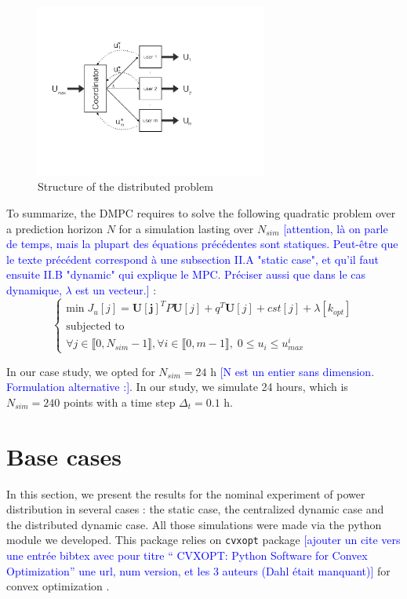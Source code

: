 \documentclass[conference]{IEEEtran}
\newcommand{\rem}[1]{\textcolor{blue}{[#1]}}
\begin{document}
\begin{figure}[!t]
\centering
\includegraphics[width=3in]{ASHschema}
\caption{Structure of the distributed problem}
\label{coord}
\end{figure}
To summarize, the DMPC requires to solve the following quadratic problem over a prediction horizon $N$ for a simulation lasting over $N_{sim}$ \rem{attention, là on parle de temps, mais la plupart des équations précédentes sont statiques. Peut-être que le texte précédent correspond à une subsection II.A "static case", et qu'il faut ensuite II.B "dynamic" qui explique le MPC.
Préciser aussi que dans le cas dynamique, $\lambda$ est un vecteur.} :
\begin{equation}
\left\{
\begin{array}{l}
\text{min} \; J_u[j] =   \bm{U[j]}^T P \bm{U}[j] + q^T \bm{U}[j] + cst[j] + \lambda[k_{opt}]  \\
\text{subjected to}\\
\forall j  \in \llbracket 0, N_{sim}-1 \rrbracket, \forall i \in \llbracket 0, m -1 \rrbracket, \; 0 \leq  u_i \leq  u_{max}^i
\end{array}
\right.
\label{QP}
\end{equation}

In our case study, we opted for $N_{sim} = 24$ h \rem{N est un entier sans dimension. Formulation alternative :}. In our study, we simulate 24 hours, which is $N_{sim} = 240$ points with a time step $\Delta_t=0.1$ h.


\section{Base cases}
In this section, we present the results for the nominal experiment of power distribution in several cases : the static case, the centralized dynamic case and the distributed dynamic case. All those simulations were made via the python module we developed. This package relies on \texttt{cvxopt} package \rem{ajouter un cite vers une entrée bibtex avec pour titre `` CVXOPT: Python Software for Convex Optimization'' une url, num version, et les 3 auteurs (Dahl était manquant)} for convex optimization \cite{Boyd}.
\end{document}
